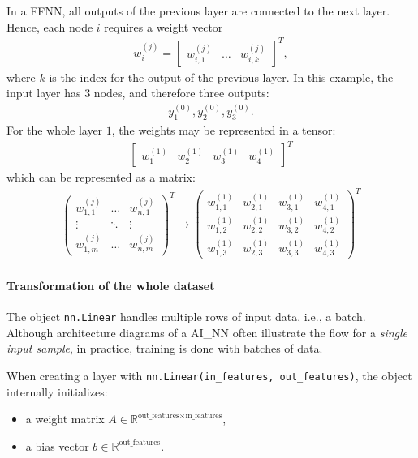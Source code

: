 In a \gls{FFNN}, all outputs of the previous layer are connected to the next layer. Hence, each node $i$ requires a weight vector
\begin{align}
	w^{(j)}_i = \begin{bmatrix} w^{(j)}_{i, 1} & \dots & w^{(j)}_{i, k} \end{bmatrix}^T,
\end{align}
where $k$ is the index for the output of the previous layer. In this example, the input layer has 3 nodes, and therefore three outputs:
\begin{align}
	y^{(0)}_1, y^{(0)}_2, y^{(0)}_3.
\end{align}
For the whole layer $1$, the weights may be represented in a tensor:
\begin{align}
 \begin{bmatrix} w_1^{(1)} & w_2^{(1)} & w_3^{(1)} & w_4^{(1)} \end{bmatrix}^T
\end{align}
which can be represented as a matrix:
\begin{align}
	\begin{pmatrix}
		w^{(j)}_{1, 1} & \dots & w^{(j)}_{n, 1} \\
		\vdots & \ddots & \vdots \\ 
		w^{(j)}_{1, m} & \dots & w^{(j)}_{n, m}
	\end{pmatrix}^T \rightarrow
	\begin{pmatrix}
		w^{(1)}_{1, 1} & w^{(1)}_{2, 1} & w^{(1)}_{3, 1} & w^{(1)}_{4, 1} \\
		w^{(1)}_{1, 2} & w^{(1)}_{2, 2} & w^{(1)}_{3, 2} & w^{(1)}_{4, 2} \\
		w^{(1)}_{1, 3} & w^{(1)}_{2, 3} & w^{(1)}_{3, 3} & w^{(1)}_{4, 3}  
	\end{pmatrix}^T
\end{align}

\paragraph{Transformation of the whole dataset}

The object \verb+nn.Linear+ handles multiple rows of input data, i.e., a batch. Although architecture diagrams of a \gls{AI_NN} often illustrate the flow for a \emph{single input sample}, in practice, training is done with batches of data.

When creating a layer with \verb+nn.Linear(in_features, out_features)+, the object internally initializes:
\begin{itemize}
	\item a weight matrix $A \in \mathbb{R}^{\text{out\_features} \times \text{in\_features}}$,
	\item a bias vector $b \in \mathbb{R}^{\text{out\_features}}$.
\end{itemize}

